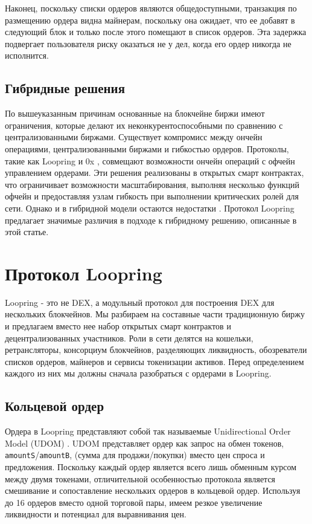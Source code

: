 \documentclass[utf8,nofonts]{article}
\begin{document}
\begin{multicols}{2}
	Наконец, поскольку списки ордеров являются общедоступными, транзакция по размещению ордера видна майнерам, поскольку она ожидает, что ее добавят в следующий блок и только после этого помещают в список ордеров. Эта задержка подвергает пользователя риску оказаться не у дел, когда его ордер никогда не исполнится.
	
	\subsection{Гибридные решения}
	По вышеуказанным причинам основанные на блокчейне биржи имеют ограничения, которые делают их неконкурентоспособными по сравнению с централизованными биржами. Существует компромисс между ончейн операциями, централизованными биржами и гибкостью ордеров. Протоколы, такие как Loopring и 0x \cite{warren20170x}, совмещают возможности ончейн операций с офчейн управлением ордерами. Эти решения реализованы в открытых смарт контрактах, что ограничивает возможности масштабирования, выполняя несколько функций офчейн и предоставляя узлам гибкость при выполнении критических ролей для сети. Однако и в гибридной модели остаются недостатки \cite {costofdecent}. Протокол Loopring предлагает значимые различия в подходе к гибридному решению, описанные в этой статье.
	
	
	\section{Протокол Loopring\label{sec:loopring_protocol}}
	Loopring - это не DEX, а модульный протокол для построения DEX для нескольких блокчейнов. Мы разбираем на составные части традиционную биржу и предлагаем вместо нее набор открытых смарт контрактов и децентрализованных участников. Роли в сети делятся на кошельки, ретрансляторы, консорциум блокчейнов, разделяющих ликвидность, обозреватели списков ордеров, майнеров и сервисы токенизации активов. Перед определением каждого из них мы должны сначала разобраться с ордерами в Loopring. 
	
	\subsection{Кольцевой ордер\label{sec:order_ring}}
	Ордера в Loopring представляют собой так называемые Unidirectional Order Model (UDOM) \cite{coinport2014udom}. UDOM представляет ордер как запрос на обмен токенов, \verb|amountS|/\verb|amountB|, (сумма для продажи/покупки) вместо цен спроса и предложения. Поскольку каждый ордер является всего лишь обменным курсом между двумя токенами, отличительной особенностью протокола является смешивание и сопоставление нескольких ордеров в кольцевой ордер. Используя до 16 ордеров вместо одной торговой пары, имеем резкое увеличение ликвидности и потенциал для выравнивания цен. 
	

\end{multicols}
\end{document}
